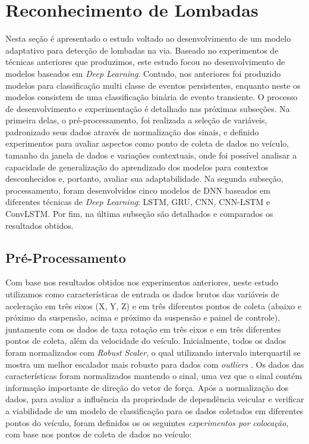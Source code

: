 \chapter{Reconhecimento de Lombadas}
\label{cap:deteccao_lombadas}

Nesta seção é apresentado o estudo voltado ao desenvolvimento de um modelo adaptativo para detecção de lombadas na via. Baseado no experimentos de técnicas anteriores que produzimos, este estudo focou no desenvolvimento de modelos baseados em \textit{Deep Learning}. Contudo, nos anteriores foi produzido modelos para classificação multi classe de eventos persistentes, enquanto neste os modelos consistem de uma classificação binária de evento transiente. O processo de desenvolvimento e experimentação é detalhado nas próximas subseções. Na primeira delas, o pré-processamento, foi realizada a seleção de variáveis, padronizado seus dados através de normalização dos sinais, e definido experimentos para avaliar aspectos como ponto de coleta de dados no veículo, tamanho da janela de dados e variações contextuais, onde foi possível analisar a capacidade de generalização do aprendizado dos modelos para contextos desconhecidos e, portanto, avaliar sua adaptabilidade. Na segunda subseção, processamento, foram desenvolvidos cinco modelos de DNN baseados em diferentes técnicas de \textit{Deep Learning}: LSTM, GRU, CNN, CNN-LSTM e ConvLSTM. Por fim, na última subseção são detalhados e comparados os resultados obtidos.

\section{Pré-Processamento}

Com base nos resultados obtidos nos experimentos anteriores, neste estudo utilizamos como características de entrada os dados brutos das variáveis de aceleração em três eixos (X, Y, Z) e em três diferentes pontos de coleta (abaixo e próximo da suspensão, acima e próximo da suspensão e painel de controle), juntamente com os dados de taxa rotação em três eixos e em três diferentes pontos de coleta, além da velocidade do veículo. Inicialmente, todos os dados foram normalizados com \textit{Robust Scaler}, o qual utilizando intervalo interquartil se mostra um melhor escalador mais robusto para dados com \textit{outliers} \cite{Vaitheeshwari2019}. Os dados das características foram normalizados mantendo o sinal, uma vez que o sinal contém informação importante de direção do vetor de força. Após a normalização dos dados, para avaliar a influência da propriedade de dependência veicular e verificar a viabilidade de um modelo de classificação para os dados coletados em diferentes pontos do veículo, foram definidos os os seguintes \emph{experimentos por colocação}, com base nos pontos de coleta de dados no veículo:

